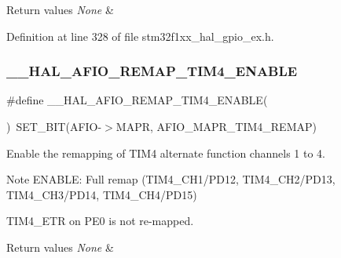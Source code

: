 \begin{DoxyRetVals}{Return values}
{\em None} & \\
\hline
\end{DoxyRetVals}


Definition at line 328 of file stm32f1xx\+\_\+hal\+\_\+gpio\+\_\+ex.\+h.

\mbox{\label{group___g_p_i_o_ex___a_f_i_o___a_f___r_e_m_a_p_p_i_n_g_ga9e9a7e0d5132518d81e0316895d4f410}} 
\subsubsection{\texorpdfstring{\+\_\+\+\_\+\+H\+A\+L\+\_\+\+A\+F\+I\+O\+\_\+\+R\+E\+M\+A\+P\+\_\+\+T\+I\+M4\+\_\+\+E\+N\+A\+B\+LE}{\_\_HAL\_AFIO\_REMAP\_TIM4\_ENABLE}}
{\footnotesize\ttfamily \#define \+\_\+\+\_\+\+H\+A\+L\+\_\+\+A\+F\+I\+O\+\_\+\+R\+E\+M\+A\+P\+\_\+\+T\+I\+M4\+\_\+\+E\+N\+A\+B\+LE(\begin{DoxyParamCaption}{ }\end{DoxyParamCaption})~S\+E\+T\+\_\+\+B\+IT(A\+F\+IO-\/$>$M\+A\+PR, A\+F\+I\+O\+\_\+\+M\+A\+P\+R\+\_\+\+T\+I\+M4\+\_\+\+R\+E\+M\+AP)}



Enable the remapping of T\+I\+M4 alternate function channels 1 to 4. 

\begin{DoxyNote}{Note}
E\+N\+A\+B\+LE\+: Full remap (T\+I\+M4\+\_\+\+C\+H1/\+P\+D12, T\+I\+M4\+\_\+\+C\+H2/\+P\+D13, T\+I\+M4\+\_\+\+C\+H3/\+P\+D14, T\+I\+M4\+\_\+\+C\+H4/\+P\+D15) 

T\+I\+M4\+\_\+\+E\+TR on P\+E0 is not re-\/mapped. 
\end{DoxyNote}

\begin{DoxyRetVals}{Return values}
{\em None} & \\
\hline
\end{DoxyRetVals}


